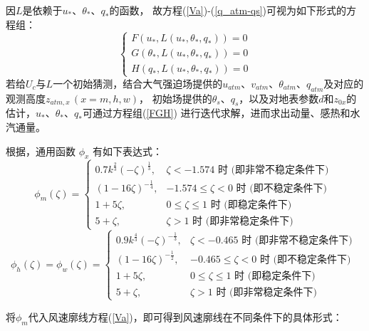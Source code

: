 因$L$是依赖于$u_\ast$、$\theta_\ast$、$q_\ast$的函数，
故方程(\ref{Va})-(\ref{q_atm-qs})可视为如下形式的方程组：
\begin{equation}\label{FGH}
\left\{\begin{array}{l}F\left(u_{*}, L\left(u_{*}, \theta_{*}, q_{*}\right)\right)=0 \\
      G\left(\theta_{*}, L\left(u_{*}, \theta_{*}, q_{*}\right)\right)=0 \\ 
      H\left(q_{*}, L\left(u_{*}, \theta_{*}, q_{*}\right)\right)=0\end{array}\right.
\end{equation}
若给$U_c$与$L$一个初始猜测，结合大气强迫场提供的$u_{atm}$、$v_{atm}$、$\theta_{atm}$、$q_{atm}$及对应的观测高度$z_{atm,x}\, (x=m,h,w)$，
初始场提供的$\theta_s$、$q_s$，以及对地表参数$d$和$z_{0x}$的估计，$u_\ast$、$\theta_\ast$、$q_\ast$可通过方程组(\ref{FGH})
进行迭代求解，进而求出动量、感热和水汽通量。

根据\citet{zeng1998intercomparison}，通用函数 $\phi_x$ 有如下表达式：
\begin{equation}\label{phim_zeng}
   \phi_{m}(\zeta)=\begin{cases}
     0.7 k^{\frac{2}{3}}(-\zeta)^{\frac{1}{3}}, & \zeta<-1.574 \text { 时 (即非常不稳定条件下) } \\
     (1-16 \zeta)^{-\frac{1}{4}}, & -1.574 \leq \zeta<0 \text { 时 (即不稳定条件下) } \\
     1+5 \zeta, & 0 \leq \zeta \leq 1 \text { 时 (即稳定条件下) } \\ 
     5+\zeta, & \zeta>1 \text { 时 (即非常稳定条件下) }
   \end{cases}
\end{equation}
\begin{equation}
  \phi_{h}(\zeta)=\phi_{w}(\zeta)=\begin{cases}
     0.9 k^{\frac{4}{3}}(-\zeta)^{-\frac{1}{3}}, & \zeta<-0.465 \text { 时 (即非常不稳定条件下) } \\ 
     (1-16 \zeta)^{-\frac{1}{2}}, & -0.465 \leq \zeta<0 \text { 时 (即不稳定条件下) } \\ 
     1+5 \zeta, & 0 \leq \zeta \leq 1 \text { 时 (即稳定条件下) } \\
     5+\zeta, & \zeta>1 \text { 时 (即非常稳定条件下) }
   \end{cases}
\end{equation}

将$\phi_m$代入风速廓线方程(\ref{Va})，即可得到风速廓线在不同条件下的具体形式：

